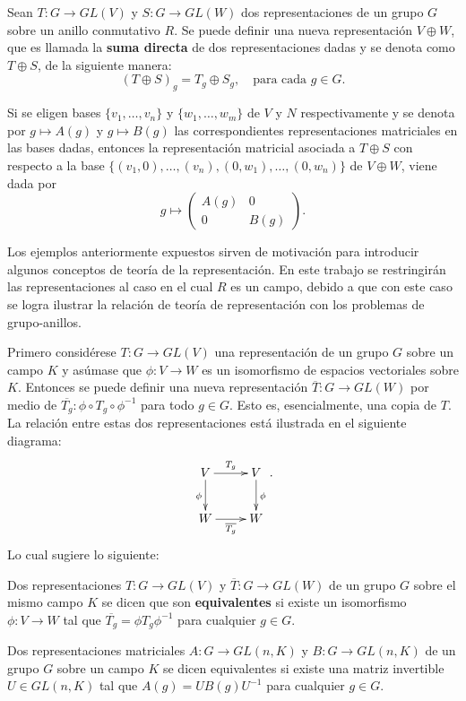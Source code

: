 \begin{ejemplo}
Sean $T \colon G \to GL(V)$ y $S \colon G \to GL(W)$ dos representaciones de un grupo $G$ sobre un anillo conmutativo $R$. Se puede definir una nueva representación $V \oplus W$, que es llamada la \textbf{suma directa} de dos representaciones dadas y se denota como $T \oplus S$, de la siguiente manera: \begin{equation*} (T \oplus S)_g = T_g \oplus S_g, \quad \mbox{para cada } g \in G. \end{equation*}

Si se eligen bases $\{v_1, \dots, v_n\}$ y $\{ w_1, \dots, w_m \}$ de $V$ y $N$ respectivamente y se denota por $g \mapsto A(g)$ y $g \mapsto B(g)$ las correspondientes representaciones matriciales en las bases dadas, entonces la representación matricial asociada a $T \oplus S$ con respecto a la base $\{ (v_1,0), \dots , (v_n), (0,w_1), \dots, (0,w_n)  \}$ de $V \oplus W$, viene dada por
\begin{equation*} g \mapsto \begin{pmatrix}
A(g) & 0 \\
0 & B(g)
\end{pmatrix}. \end{equation*}

\end{ejemplo}

Los ejemplos anteriormente expuestos sirven de motivación para introducir algunos conceptos de teoría de la representación. En este trabajo se restringirán las representaciones al caso en el cual $R$ es un campo, debido a que con este caso se logra ilustrar la relación de teoría de representación con los problemas de grupo-anillos.

Primero considérese $T \colon G \to GL(V)$ una representación de un grupo $G$ sobre un campo $K$ y asúmase que $\phi \colon V \to W$ es un isomorfismo de espacios vectoriales sobre $K$. Entonces se puede definir una nueva representación $\overline{T} \colon G \to GL(W)$ por medio de $\overline{T_g} \colon \phi \circ T_g \circ \phi^{-1}$ para todo $g \in G$. Esto es, esencialmente, una copia de $T$. La relación entre estas dos representaciones está ilustrada en el siguiente diagrama:
\begin{equation*}\xymatrix { V \ar[r]^{T_g} 
\ar[d]_{\phi}
 & V \ar[d]^{\phi} \\
W \ar[r]_{\overline{T_g}} & W}.\end{equation*}
Lo cual sugiere lo siguiente:
\begin{definicion}
Dos representaciones $T \colon G \to GL(V)$ y $\overline{T} \colon G \to GL(W)$ de un grupo $G$ sobre el mismo campo $K$ se dicen que son \textbf{equivalentes} si existe un isomorfismo $\phi \colon V \to W$ tal que $\overline{T_g} = \phi T_g \phi^{-1} $ para cualquier $g \in G$.
\end{definicion}
\begin{definicion}
Dos representaciones matriciales $A \colon G \to GL(n,K)$ y $B \colon G \to GL(n,K)$ de un grupo $G$ sobre un campo $K$ se dicen equivalentes si existe una matriz invertible $U \in GL(n,K)$ tal que $A(g) = UB(g)U^{-1}$ para cualquier $g \in G$.
\end{definicion}

